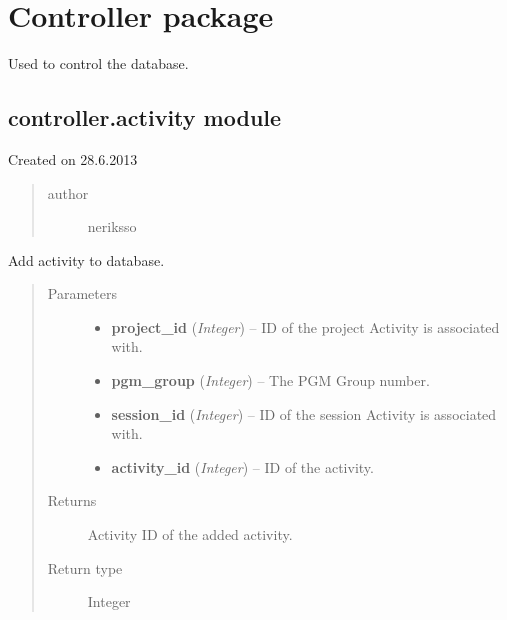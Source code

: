 \documentclass[letterpaper,10pt,english]{sphinxmanual}
\begin{document}
\section{Controller package}
\label{controller::doc}\label{controller:controller-package}
Used to control the database.


\subsection{controller.activity module}
\label{controller:module-controller.activity}\label{controller:controller-activity-module}
Created on 28.6.2013
\begin{quote}\begin{description}
\item[{author}] \leavevmode
neriksso

\end{description}\end{quote}

\begin{fulllineitems}
\label{controller:controller.activity.add_activity}
Add activity to database.
\begin{quote}\begin{description}
\item[{Parameters}] \leavevmode\begin{itemize}
\item {} 
\textbf{project\_id} (\emph{Integer}) -- ID of the project Activity is associated with.

\item {} 
\textbf{pgm\_group} (\emph{Integer}) -- The PGM Group number.

\item {} 
\textbf{session\_id} (\emph{Integer}) -- ID of the session Activity is associated with.

\item {} 
\textbf{activity\_id} (\emph{Integer}) -- ID of the activity.

\end{itemize}

\item[{Returns}] \leavevmode
Activity ID of the added activity.

\item[{Return type}] \leavevmode
Integer

\end{description}\end{quote}

\end{fulllineitems}
\end{document}

